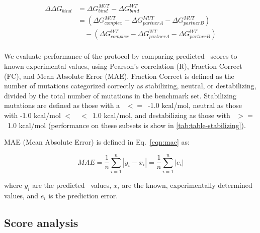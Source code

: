 \begin{equation}\label{eqn:split-ddg}
  \begin{split}
    {\Delta\Delta}G_{bind} & ={\Delta}G^{MUT}_{bind} - {\Delta}G^{WT}_{bind}\\
    & =({\Delta}G^{MUT}_{complex} - {\Delta}G^{MUT}_{partner A} - {\Delta}G^{MUT}_{partner B})\\
    & \quad - ({\Delta}G^{WT}_{complex} - {\Delta}G^{WT}_{partner A} - {\Delta}G^{WT}_{partner B})\\
  \end{split}
\end{equation}

We evaluate performance of the protocol by comparing predicted \ddg\ scores to known experimental values, using Pearson's correlation (R), Fraction Correct (FC), and Mean Absolute Error (MAE). Fraction Correct is defined as the number of mutations categorized correctly as stabilizing, neutral, or destabilizing, divided by the total number of mutations in the benchmark set. Stabilizing mutations are defined as those with a \ddg\ $<=$\ -1.0 kcal/mol, neutral as those with -1.0 kcal/mol $<$\ \ddg\ $<$\ 1.0 kcal/mol, and destabilizing as those with \ddg\ $>=$\ 1.0 kcal/mol (performance on these subsets is show in \cref{tab:table-stabilizing}).

MAE (Mean Absolute Error) is defined in Eq.~\ref{eqn:mae} as:

\begin{equation}\label{eqn:mae}
  MAE = \dfrac{1}{n}\sum\limits_{i=1}^n|y_i-x_i| = \dfrac{1}{n}\sum\limits_{i=1}^n|e_i|
\end{equation}

where $y_i$ are the predicted \ddg\ values, $x_i$ are the known, experimentally determined values, and $e_i$ is the prediction error.

\subsection{Score analysis}

